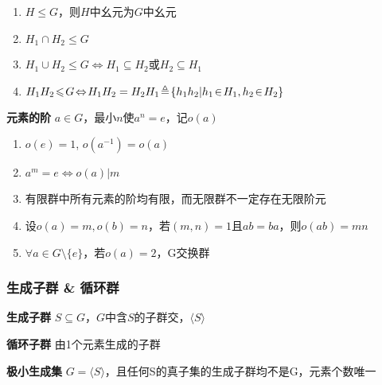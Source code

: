 \documentclass[a4paper,10pt]{ctexart}
\renewcommand*{\iff}{\Leftrightarrow}
\renewcommand*{\leq}{\leqslant}
\newcommand*{\gengroup}[1]{\langle #1 \rangle}
\begin{document}
\begin{multicols}{3}
    \begin{theorem}[子群运算律($H_1, H_2 \!\leq\! G$)]
        \hfil

        \begin{enumerate}
            \item $H \!\leq\! G$，则$H$中幺元为$G$中幺元
            \item $H_1 \!\cap\! H_2 \!\leq\! G$
            \item $H_1 \!\cup\! H_2 \!\leq\! G \!\iff\! H_1 \!\subseteq\! H_2 $或$H_2 \!\subseteq\! H_1$
            \item $H_1 H_2 \!\leq\! G \!\iff\! H_1 H_2 = H_2 H_1 \\ \!\triangleq\! \{h_1h_2 | h_1 \!\in\! H_1, h_2 \!\in\! H_2\}$
        \end{enumerate}
    \end{theorem}

    \textbf{元素的阶} $a \!\in\! G$，最小$n$使$a^n \!=\! e$，记$o(a)$

    \begin{theorem}[阶的性质]
        \hfil

        \begin{enumerate}
            \item $o(e) = 1$, $o(a^{-1}) = o(a)$
            \item $a^m = e \iff o(a) | m$
            \item 有限群中所有元素的阶均有限，而无限群不一定存在无限阶元
            \item 设$o(a) = m, o(b) = n$，若$(m, n) = 1$且$ab = ba$，则$o(ab) = mn$
            \item $\forall a \!\in\! G \!\setminus\! \{e\}$，若$o(a) = 2$，G交换群
        \end{enumerate}
    \end{theorem}

    \subsubsection{生成子群 \& 循环群}

    \textbf{生成子群} $S \!\subseteq\! G$，$G$中含$S$的子群交，$\gengroup{S}$

    \textbf{循环子群} 由1个元素生成的子群

    \textbf{极小生成集} $G \! = \! \gengroup{S}$，且任何S的真子集的生成子群均不是G，元素个数唯一

    \begin{theorem}[循环群性质]
        \hfil


\end{theorem}
\end{multicols}
\end{document}
